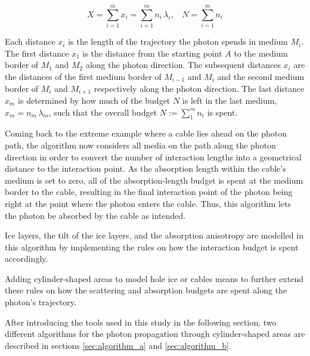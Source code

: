 \begin{equation}
  X = \sum_{i=1}^m x_i = \sum_{i=1}^m n_i\,\lambda_i, \ \ \ \ N = \sum_{i=1}^m n_i
  \label{eq:convertbudgettodistance}
\end{equation}

Each distance $x_i$ is the length of the trajectory the photon spends in medium $M_i$. The first distance $x_1$ is the distance from the starting point $A$ to the medium border of $M_1$ and $M_2$ along the photon direction. The subsequent distances $x_i$ are the distances of the first medium border of $M_{i-1}$ and $M_i$ and the second medium border of $M_i$ and $M_{i+1}$ respectively along the photon direction. The last distance $x_m$ is determined by how much of the budget $N$ is left in the last medium, $x_m = n_m\,\lambda_m$, such that the overall budget $N:=\sum_1^m n_i$ is spent.


Coming back to the extreme example where a cable lies ahead on the photon path, the algorithm now considers all media on the path along the photon direction in order to convert the number of interaction lengths into a geometrical distance to the interaction point. As the absorption length within the cable's medium is set to zero, all of the absorption-length budget is spent at the medium border to the cable, resulting in the final interaction point of the photon being right at the point where the photon enters the cable. Thus, this algorithm lets the photon be absorbed by the cable as intended.

Ice layers, the tilt of the ice layers, and the absorption anisotropy are modelled in this algorithm by implementing the rules on how the interaction budget is spent accordingly.

Adding cylinder-shaped areas to model hole ice or cables means to further extend these rules on how the scattering and absorption budgets are spent along the photon's trajectory.

After introducing the tools used in this study in the following section, two different algorithms for the photon propagation through cylinder-shaped areas are described in sections \ref{sec:algorithm_a} and \ref{sec:algorithm_b}.
